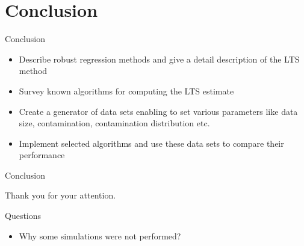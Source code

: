 \documentclass{beamer}
\begin{document}
\section{Conclusion}
\setcounter{subsection}{1}

\begin{frame}{Conclusion}
  \begin{itemize}
    \item[\checkmark]  Describe robust regression methods and give a detail description of the LTS method
    \item[\checkmark] Survey known algorithms for computing the LTS estimate
    \item[\checkmark] Create a generator of data sets enabling to set various parameters like data size, contamination, contamination distribution etc.
    \item[\checkmark] Implement selected algorithms and use these data sets to compare their performance
  \end{itemize}      
\end{frame}


\begin{frame}{Conclusion}
  \begin{center}
    Thank you for your attention.
  \end{center}
\end{frame}

\begin{frame}{Questions}
  \begin{itemize}
    \item Why some simulations were not performed?
  \end{itemize}      
\end{frame}
\end{document}
